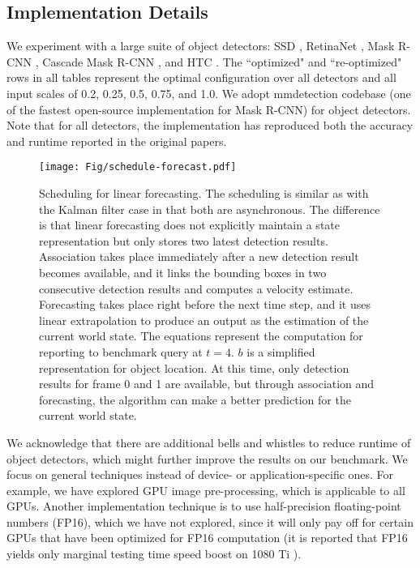 \subsection{Implementation Details}

We experiment with a large suite of object detectors: SSD \cite{Liu2016SSDSS}, RetinaNet \cite{lin2017focal}, Mask R-CNN \cite{He2017MaskR}, Cascade Mask R-CNN \cite{Cai2018CascadeRD}, and HTC \cite{chen2019hybrid}. The ``optimized" and ``re-optimized" rows in all tables represent the optimal configuration over all detectors and all input scales of 0.2, 0.25, 0.5, 0.75, and 1.0. We adopt mmdetection codebase \cite{mmdetection} (one of the fastest open-source implementation for Mask R-CNN) for object detectors. Note that for all detectors, the implementation has reproduced both the accuracy and runtime reported in the original papers.

\begin{figure}[!b]
\centering
\texttt{[image: Fig/schedule-forecast.pdf]}
\caption{Scheduling for linear forecasting. The scheduling is similar as with the Kalman filter case in that both are asynchronous. The difference is that linear forecasting does not explicitly maintain a state representation but only stores two latest detection results. Association takes place immediately after a new detection result becomes available, and it links the bounding boxes in two consecutive detection results and computes a velocity estimate. Forecasting takes place right before the next time step, and it uses linear extrapolation to produce an output as the estimation of the current world state. The equations represent the computation for reporting to benchmark query at $t=4$. $b$ is a simplified representation for object location. At this time, only detection results for frame 0 and 1 are available, but through association and forecasting, the algorithm can make a better prediction for the current world state.}
\label{fig:linear-forecast}
\end{figure}

 We acknowledge that there are additional bells and whistles to reduce runtime of object detectors, which might further improve the results on our benchmark. We focus on general techniques instead of device- or application-specific ones. For example, we have explored GPU image pre-processing, which is applicable to all GPUs. Another implementation technique is to use half-precision floating-point numbers (FP16), which we have not explored, since it will only pay off for certain GPUs that have been optimized for FP16 computation (it is reported that FP16 yields only marginal testing time speed boost on 1080 Ti \cite{chen2019simpledet}).





